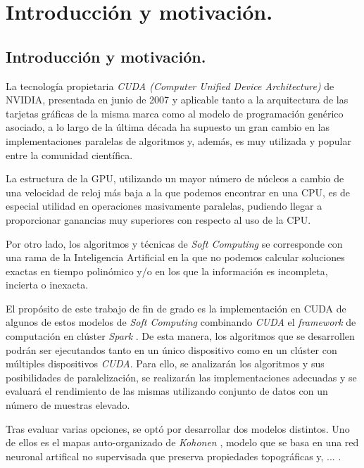 \documentclass[a4paper,oneside,11pt,titlepage]{book}
\begin{document}

  
\frontmatter
\tableofcontents
\listoffigures
\listoftables

%
\mainmatter
\setlength{\parskip}{5pt}
\chapter{Introducción y motivación.}
\section{Introducción y motivación.}
La tecnología propietaria \textit{CUDA (Computer Unified Device Architecture)} \cite{cuda} de NVIDIA, presentada en junio de 2007 y aplicable tanto a la arquitectura de las tarjetas gráficas de la misma marca como al modelo de programación genérico asociado, a lo largo de la última década ha supuesto un gran cambio en las implementaciones paralelas de algoritmos y, además, es muy utilizada y popular entre la comunidad científica.

La estructura de la GPU, utilizando un mayor número de núcleos a cambio de una velocidad de reloj más baja a la que podemos encontrar en una CPU, es de especial utilidad en operaciones masivamente paralelas, pudiendo llegar a proporcionar ganancias muy superiores con respecto al uso de la CPU.

Por otro lado, los algoritmos y técnicas de \textit{Soft Computing} se corresponde con una rama de la Inteligencia Artificial en la que no podemos calcular soluciones exactas en tiempo polinómico y/o en los que la información es incompleta, incierta o inexacta.

El propósito de este trabajo de fin de grado es la implementación en CUDA de algunos de estos modelos de \textit{Soft Computing} combinando \textit{CUDA} el \textit{framework} de computación en clúster \textit{Spark} \cite{spark}. De esta manera, los algoritmos que se desarrollen podrán ser ejecutandos tanto en un único dispositivo como en un clúster con múltiples dispositivos \textit{CUDA}. Para ello, se analizarán los algoritmos y sus posibilidades de paralelización, se realizarán las implementaciones adecuadas y se evaluará el rendimiento de las mismas utilizando conjunto de datos con un número de muestras elevado.

Tras evaluar varias opciones, se optó por desarrollar dos modelos distintos. Uno de ellos es el mapas auto-organizado de \textit{Kohonen} \cite{kohonensom}, modelo que se basa en una red neuronal artifical no supervisada que preserva propiedades topográficas y, ... . \\
\end{document}
